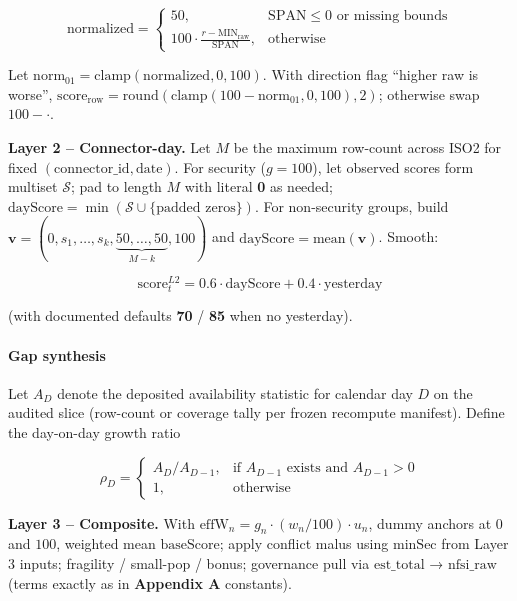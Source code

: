 \documentclass[
  11pt,
  peerreview,journal,onecolumn]{IEEEtran}
\begin{document}
\[\mathrm{normalized}=
\begin{cases}
50, & \mathrm{SPAN}\le 0 \text{ or missing bounds} \\
100\cdot\frac{r-\mathrm{MIN}_{\mathrm{raw}}}{\mathrm{SPAN}}, & \text{otherwise}
\end{cases}\]

Let \(\mathrm{norm}_{01}=\mathrm{clamp}(\mathrm{normalized},0,100)\).
With direction flag ``higher raw is worse'',
\(\mathrm{score}_{\mathrm{row}}=\mathrm{round}\!\left(\mathrm{clamp}(100-\mathrm{norm}_{01},0,100),2\right)\);
otherwise swap \(100-\cdot\).

\textbf{Layer 2 -- Connector-day.} Let \(M\) be the maximum row-count
across ISO2 for fixed \((\mathrm{connector\_id},\mathrm{date})\). For
security (\(g=100\)), let observed scores form multiset \(\mathcal{S}\);
pad to length \(M\) with literal \textbf{0} as needed;
\(\mathrm{dayScore}=\min(\mathcal{S}\cup\{\text{padded zeros}\})\). For
non-security groups, build
\(\mathbf{v}=(0,s_1,\ldots,s_k,\underbrace{50,\ldots,50}_{M-k},100)\)
and \(\mathrm{dayScore}=\mathrm{mean}(\mathbf{v})\). Smooth:

\[\mathrm{score}^{L2}_{t}=0.6\cdot \mathrm{dayScore}+0.4\cdot \mathrm{yesterday}\]

(with documented defaults \textbf{70} / \textbf{85} when no yesterday).

\hypertarget{gap-synthesis}{%
\paragraph{Gap synthesis}\label{gap-synthesis}}

Let \(A_D\) denote the deposited availability statistic for calendar day
\(D\) on the audited slice (row-count or coverage tally per frozen
recompute manifest). Define the day-on-day growth ratio

\[\rho_D =
\begin{cases}
A_D / A_{D-1}, & \text{if } A_{D-1} \text{ exists and } A_{D-1} > 0 \\
1, & \text{otherwise}
\end{cases}\]

\textbf{Layer 3 -- Composite.} With
\(\mathrm{effW}_n=g_n\cdot(w_n/100)\cdot u_n\), dummy anchors at \(0\)
and \(100\), weighted mean \(\mathrm{baseScore}\); apply conflict malus
using \(\mathrm{minSec}\) from Layer 3 inputs; fragility / small-pop /
bonus; governance pull via \(\mathrm{est\_total}\) →
\(\mathrm{nfsi\_raw}\) (terms exactly as in \textbf{Appendix A}
constants).
\end{document}
